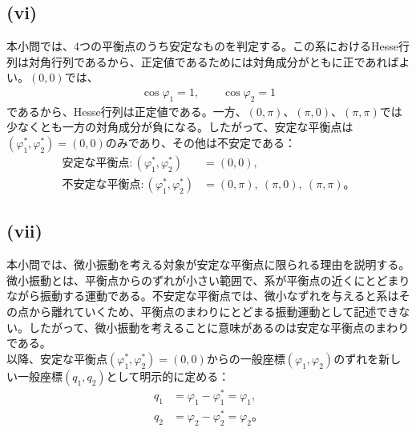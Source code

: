   \subsection*{(vi)}
  本小問では、4つの平衡点のうち安定なものを判定する。この系におけるHesse行列は対角行列であるから、正定値であるためには対角成分がともに正であればよい。$(0,0)$では、
  \begin{align*}
    \cos\varphi_1=1,\qquad \cos\varphi_2=1
  \end{align*}
  であるから、Hesse行列は正定値である。一方、$(0,\pi)$、$(\pi,0)$、$(\pi,\pi)$では少なくとも一方の対角成分が負になる。したがって、安定な平衡点は$(\varphi_1^*,\varphi_2^*)=(0,0)$のみであり、その他は不安定である：
  \begin{align*}
    \text{安定な平衡点}:(\varphi_1^*,\varphi_2^*)&=(0,0),\tag{90}\\
    \text{不安定な平衡点}:(\varphi_1^*,\varphi_2^*)&=(0,\pi),\ (\pi,0),\ (\pi,\pi)。\tag{91}
  \end{align*}
  
  \subsection*{(vii)}
  本小問では、微小振動を考える対象が安定な平衡点に限られる理由を説明する。\\
  微小振動とは、平衡点からのずれが小さい範囲で、系が平衡点の近くにとどまりながら振動する運動である。不安定な平衡点では、微小なずれを与えると系はその点から離れていくため、平衡点のまわりにとどまる振動運動として記述できない。したがって、微小振動を考えることに意味があるのは安定な平衡点のまわりである。\\
  以降、安定な平衡点$(\varphi_1^*,\varphi_2^*)=(0,0)$からの一般座標$(\varphi_1,\varphi_2)$のずれを新しい一般座標$(q_1,q_2)$として明示的に定める：
  \begin{align*}
    q_1&=\varphi_1-\varphi_1^*=\varphi_1,\tag{92}\\
    q_2&=\varphi_2-\varphi_2^*=\varphi_2。\tag{93}
  \end{align*}
  
